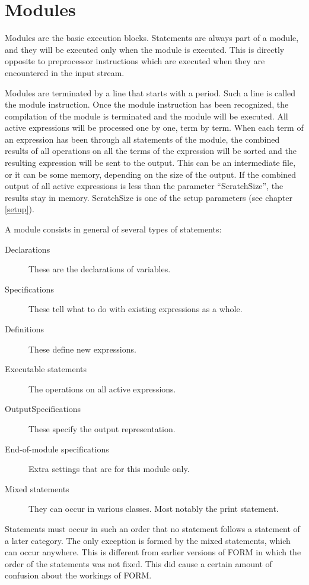 
\chapter{Modules}
\label{modules}

Modules are the basic execution blocks. 
Statements are always part of a module, and they will be 
executed only when the module is executed. This is directly opposite to 
preprocessor instructions which are executed when they are encountered in 
the input stream.

Modules are terminated by a line that starts with a period. 
Such a line is called the module instruction. 
Once the module instruction has been recognized, the compilation of the 
module is terminated and the module will be executed. All active 
expressions will be processed one by one, term by term. When each term of 
an expression has been through all statements of the module, the combined 
results of all operations on all the terms of the expression will be sorted 
and the resulting expression will be sent to the output. This can be an 
intermediate file, or it can be some 
memory, depending on the size of the output. If the combined 
output of all active expressions is less than the parameter 
``ScratchSize'', the results stay in memory. ScratchSize 
is one of the setup parameters (see chapter \ref{setup}).

A module consists in general of several types of statements:
\begin{description}
\item [Declarations] These are the declarations of 
variables.
\item [Specifications] These tell what to do with 
existing expressions as a whole.
\item [Definitions] These define new expressions.
\item [Executable statements] The operations 
on all active expressions.
\item [OutputSpecifications] These specify the 
output representation.
\item [End-of-module specifications] 
Extra settings that are for this module only.
\item [Mixed statements] They can occur in various 
classes. Most notably the print statement.
\end{description}
Statements must occur in such an order that no statement follows a 
statement of a later category. The only exception is formed by the mixed 
statements, which can occur anywhere. This is different from earlier 
versions of FORM in which the order of the statements was not fixed. This 
did cause a certain amount of confusion about the workings of FORM.

